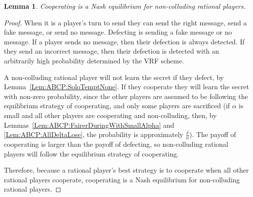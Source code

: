\documentclass[12pt]{dalcsthesis}
\newtheorem{lemma}{Lemma}
\begin{document}
\begin{lemma}Cooperating is a Nash equilibrium for non-colluding rational players.\end{lemma}
\begin{proof}
When it is a player's turn to send they can send the right message, send a fake message, or send no message. Defecting is sending a fake message or no message. If a player sends no message, then their defection is always detected. If they send an incorrect message, then their defection is detected with an arbitrarily high probability determined by the VRF scheme.

A non-colluding rational player will not learn the secret if they defect, by Lemma~\ref{Lem:ABCP:SoloTemptNone}. If they cooperate they will learn the secret with non-zero probability, since the other players are assumed to be following the equilibrium strategy of cooperating, and only some players are sacrificed (if $\alpha$ is small and all other players are cooperating and non-colluding, then, by Lemmas~\ref{Lem:ABCP:FairerDuringWithSmallAlpha} and \ref{Lem:ABCP:AllDeltaLose}, the probability is approximately $\frac{\delta}{n}$). The payoff of cooperating is larger than the payoff of defecting, so non-colluding rational players will follow the equilibrium strategy of cooperating.

Therefore, because a rational player's best strategy is to cooperate when all other rational players cooperate, cooperating is a Nash equilibrium for non-colluding rational players. 
\end{proof}
\end{document}
